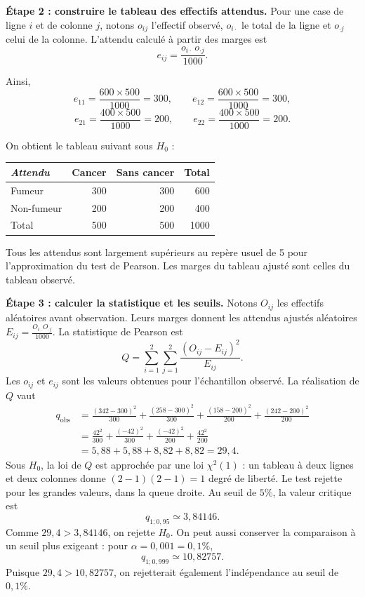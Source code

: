 {\begin{enumerate}
{\begin{minipage}{\linewidth}
\textbf{Étape 2 : construire le tableau des effectifs attendus.} Pour une case de ligne $i$ et de colonne $j$, notons $o_{ij}$ l'effectif observé, $o_{i\cdot}$ le total de la ligne et $o_{\cdot j}$ celui de la colonne. L'attendu calculé à partir des marges est
\[
e_{ij}=\frac{o_{i\cdot}\,o_{\cdot j}}{1000}.
\]
\end{minipage}\par
Ainsi,
\[
e_{11}=\frac{600\times500}{1000}=300,\qquad
 e_{12}=\frac{600\times500}{1000}=300,
\]
\[
e_{21}=\frac{400\times500}{1000}=200,\qquad
 e_{22}=\frac{400\times500}{1000}=200.
\]
\begin{minipage}{\linewidth}
On obtient le tableau suivant sous $H_0$ :
\begin{center}
\begin{tabular}{lrrr}\hline
\emph{Attendu} & Cancer & Sans cancer & Total \\ \hline
Fumeur & 300 & 300 & 600 \\
Non-fumeur & 200 & 200 & 400 \\ \hline
Total & 500 & 500 & 1000 \\ \hline
\end{tabular}
\end{center}
\end{minipage}
Tous les attendus sont largement supérieurs au repère usuel de 5 pour l'approximation du test de Pearson. Les marges du tableau ajusté sont celles du tableau observé.

\textbf{Étape 3 : calculer la statistique et les seuils.} Notons $O_{ij}$ les effectifs aléatoires avant observation. Leurs marges donnent les attendus ajustés aléatoires $E_{ij}=\frac{O_{i\cdot}O_{\cdot j}}{1000}$. La statistique de Pearson est
\[
Q=\sum_{i=1}^2\sum_{j=1}^2\frac{(O_{ij}-E_{ij})^2}{E_{ij}}.
\]
Les $o_{ij}$ et $e_{ij}$ sont les valeurs obtenues pour l'échantillon observé. La réalisation de $Q$ vaut
\begin{align*}
q_{\mathrm{obs}}
&=\frac{(342-300)^2}{300}+\frac{(258-300)^2}{300}
 +\frac{(158-200)^2}{200}+\frac{(242-200)^2}{200}\\
&=\frac{42^2}{300}+\frac{(-42)^2}{300}
 +\frac{(-42)^2}{200}+\frac{42^2}{200}\\
&=5{,}88+5{,}88+8{,}82+8{,}82=29{,}4.
\end{align*}
Sous $H_0$, la loi de $Q$ est approchée par une loi $\chi^2(1)$ : un tableau à deux lignes et deux colonnes donne $(2-1)(2-1)=1$ degré de liberté. Le test rejette pour les grandes valeurs, dans la queue droite.
Au seuil de $5\%$, la valeur critique est
\[
q_{1;0{,}95}\simeq3{,}84146.
\]
Comme $29{,}4>3{,}84146$, on rejette $H_0$. On peut aussi conserver la comparaison à un seuil plus exigeant : pour $\alpha=0{,}001=0{,}1\%$,
\[
q_{1;0{,}999}\simeq10{,}82757.
\]
Puisque $29{,}4>10{,}82757$, on rejetterait également l'indépendance au seuil de $0{,}1\%$.

}
\end{enumerate}}
